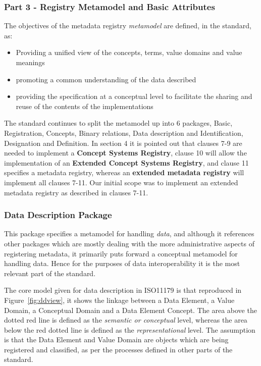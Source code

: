 \documentclass[runningheads]{llncs}
\begin{document}
	
	\subsubsection{Part 3 - Registry Metamodel and Basic Attributes}
	The objectives of the metadata registry \emph{metamodel} are defined, in the standard, as:
	\begin{itemize}
		\item Providing a unified view of the concepts, terms, value domains and value meanings
		\item promoting a common understanding of the data described
		\item providing the specification at a conceptual level to facilitate the sharing and reuse of the contents of the implementations
	\end{itemize}
	The standard continues to split the metamodel up into 6 packages, Basic, Registration, Concepts, Binary relations, Data description and Identification, Designation and Definition.
	In section 4 it is pointed out that clauses 7-9 are needed to implement a \textbf{Concept Systems Registry}, clause 10 will allow the implementation of an \textbf{Extended Concept Systems Registry}, and clause 11 specifies a metadata registry, whereas an \textbf{extended metadata registry} will implement all clauses 7-11. Our initial scope was to implement an extended metadata registry as described in clauses 7-11.
	
	\subsubsection{Data Description Package}
	This package specifies a metamodel for handling \emph{data}, and although it references other packages which are mostly dealing with the more administrative aspects of registering metadata, it primarily puts forward a conceptual metamodel for handling data. Hence for the purposes of data interoperability it is the most relevant part of the standard.
	
	The core model given for data description in ISO11179 is that reproduced in Figure~\ref{fig:ddview}, it shows the linkage between a Data Element, a Value Domain, a Conceptual Domain and a Data Element Concept. The area above the dotted red line is defined as the \emph{semantic or conceptual} level, whereas the area below the red dotted line is defined as the \emph{representational} level. The assumption is that the Data Element and Value Domain are objects which are being registered and classified, as per the processes defined in other parts of the standard. 
	
\end{document}
